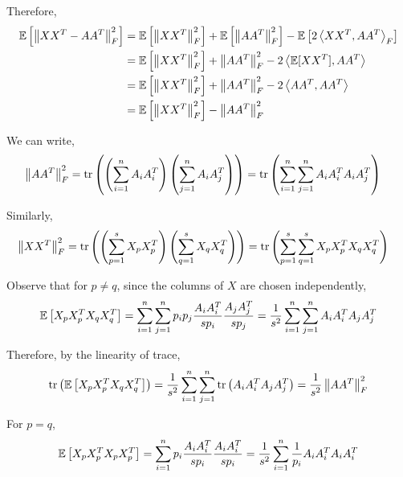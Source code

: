 \documentclass[10pt]{article}
\newcommand{\tr}{\operatorname{tr}}
\begin{document}
\begin{solution}[Solution]
\begin{enumerate}[label=(\alph*)]
        Therefore,
        \begin{align*}
            \mathbb{E} \left[ \left\lVert XX^T - AA^T\right\rVert_F^2 \right] &= \mathbb{E} \left[ \left\lVert XX^T\right\rVert_F^2 \right] + \mathbb{E}\left[\left\lVert AA^T\right\rVert_F^2\right] - \mathbb{E}\left[ 2\left\langle XX^T,AA^T \right\rangle_F \right]
            \\&= \mathbb{E} \left[ \left\lVert XX^T\right\rVert_F^2 \right] + \left\lVert AA^T\right\rVert_F^2 - 2 \left\langle \mathbb{E}[XX^T],AA^T \right\rangle
            \\&= \mathbb{E} \left[ \left\lVert XX^T\right\rVert_F^2 \right] + \left\lVert AA^T\right\rVert_F^2 - 2 \left\langle AA^T,AA^T \right\rangle
            \\&= \mathbb{E} \left[ \left\lVert XX^T\right\rVert_F^2 \right] - \left\lVert AA^T\right\rVert_F^2
        \end{align*}
        
        We can write,
        \begin{align*}
            \norm{AA^T}_F^2 &= \tr\left( \left( \sum_{i=1}^{n} A_iA_i^T \right) \left( \sum_{j=1}^{n} A_iA_j^T \right) \right)
            = \tr\left( \sum_{i=1}^{n} \sum_{j=1}^{n} A_iA_i^T A_iA_j^T  \right)
        \end{align*}
        
    
        Similarly,
        \begin{align*}
            \norm{XX^T}_F^2 &= \tr\left( \left( \sum_{p=1}^{s} X_pX_p^T \right) \left( \sum_{q=1}^{s} X_qX_q^T \right) \right)
            = \tr \left( \sum_{p=1}^{s} \sum_{q=1}^{s} X_pX_p^TX_qX_q^T \right)
        \end{align*}


        Observe that for \( p\neq q \), since the columns of \( X \) are chosen independently,
        \begin{align*}
            \mathbb{E}\left[ X_pX_p^TX_qX_q^T \right]
            = \sum_{i=1}^{n} \sum_{j=1}^{n} p_i p_j \frac{A_iA_i^T}{s p_i} \frac{A_jA_j^T}{s p_j}
            = \frac{1}{s^2}\sum_{i=1}^{n} \sum_{j=1}^{n} A_iA_i^T A_jA_j^T
        \end{align*}
       
        Therefore, by the linearity of trace,
        \begin{align*}
            \tr \left( \EE \left[ X_pX_p^TX_qX_q^T \right] \right) 
            = \frac{1}{s^2} \sum_{i=1}^{n} \sum_{j=1}^{n} \tr \left( A_iA_i^TA_jA_j^T \right)
            = \frac{1}{s^2} \norm{AA^T}_F^2
        \end{align*}
        
        For \( p=q \),
        \begin{align*}
            \mathbb{E} \left[ X_pX_p^TX_pX_p^T \right]
            = \sum_{i=1}^{n} p_i \frac{A_iA_i^T}{s p_i} \frac{A_iA_i^T}{s p_i}
            = \frac{1}{s^2}\sum_{i=1}^{n} \frac{1}{p_i} A_iA_i^TA_iA_i^T
        \end{align*}
        

\end{enumerate}
\end{solution}
\end{document}
